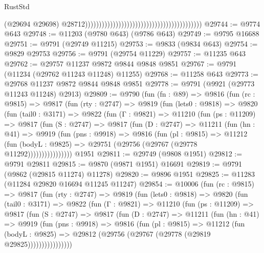 \begin{lexlean}{RustStd}
\begin{coremodule}
                                                                                        (@29694
                                                                                          @29698)
                                                                                        @28712))))))))))))))))))))))))))))))))))))))))))
@29744 := @9774 @643
@29748 := @11203 (@9780 @643) (@9786 @643)
@29749 := @9795 @16688
@29751 := @9791 (@29749 @11215)
@29753 := @9833 (@9834 @643)
@29754 := @9829 @29753
@29756 := @9791 (@29754 @11229)
@29757 := @11235 @643
@29762 := @29757 @11237 @9872 @9844 @9848 @9851
@29767 := @9791 (@11234 (@29762 @11243 @11248) @11255)
@29768 := @11258 @643
@29773 := @29768 @11237 @9872 @9844 @9848 @9851
@29778 := @9791 (@9921 (@29773 @11243 @11248) @2913)
@29809 := @9790
    (fun (fn : @89) =>
    @9816
      (fun (rc : @9815) =>
      @9817
        (fun (rty : @2747) =>
        @9819
          (fun (lets0 : @9818) =>
          @9820
            (fun (tail0 : @3171) =>
            @9822
              (fun (Γ : @9821) =>
              @11210
                (fun (ps : @11209) =>
                @9817
                  (fun (S : @2747) =>
                  @9817
                    (fun (D : @2747) =>
                    @11211
                      (fun (hn : @41) =>
                      @9919
                        (fun (pns : @9918) =>
                        @9816
                          (fun (pl : @9815) =>
                          @11212
                            (fun (bodyL : @9825) =>
                            @29751 (@29756 (@29767 (@29778 @11292))))))))))))))))
    @1951
@29811 := @29749 (@9808 @1951)
@29812 := @9791 @29811
@29815 := @9870 (@9871 @1951) @16691
@29819 := @9791 (@9862 (@29815 @11274) @11278)
@29820 := @9896 @1951
@29825 := @11283 (@11284 @29820 @16694 @11245 @11247)
@29854 := @10006
    (fun (rc : @9815) =>
    @9817
      (fun (rty : @2747) =>
      @9819
        (fun (lets0 : @9818) =>
        @9820
          (fun (tail0 : @3171) =>
          @9822
            (fun (Γ : @9821) =>
            @11210
              (fun (ps : @11209) =>
              @9817
                (fun (S : @2747) =>
                @9817
                  (fun (D : @2747) =>
                  @11211
                    (fun (hn : @41) =>
                    @9919
                      (fun (pns : @9918) =>
                      @9816
                        (fun (pl : @9815) =>
                        @11212
                          (fun (bodyL : @9825) =>
                          @29812 (@29756 (@29767 (@29778 (@29819 @29825))))))))))))))))

\end{coremodule}
\end{lexlean}
